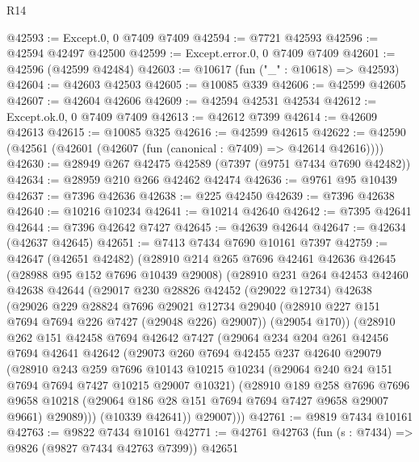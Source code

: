 \begin{lexlean}{R14}
\begin{coremodule}
@42593 := Except.{0, 0} @7409 @7409
@42594 := @7721 @42593
@42596 := @42594 @42497 @42500
@42599 := Except.error.{0, 0} @7409 @7409
@42601 := @42596 (@42599 @42484)
@42603 := @10617 (fun ("_" : @10618) => @42593)
@42604 := @42603 @42503
@42605 := @10085 @339
@42606 := @42599 @42605
@42607 := @42604 @42606
@42609 := @42594 @42531 @42534
@42612 := Except.ok.{0, 0} @7409 @7409
@42613 := @42612 @7399
@42614 := @42609 @42613
@42615 := @10085 @325
@42616 := @42599 @42615
@42622 := @42590 (@42561 (@42601 (@42607 (fun (canonical : @7409) => @42614 @42616))))
@42630 := @28949 @267 @42475 @42589 (@7397 (@9751 @7434 @7690 @42482))
@42634 := @28959 @210 @266 @42462 @42474
@42636 := @9761 @95 @10439
@42637 := @7396 @42636
@42638 := @225 @42450
@42639 := @7396 @42638
@42640 := @10216 @10234
@42641 := @10214 @42640
@42642 := @7395 @42641
@42644 := @7396 @42642 @7427
@42645 := @42639 @42644
@42647 := @42634 (@42637 @42645)
@42651 := @7413 @7434 @7690 @10161 @7397
@42759 := @42647
    (@42651 @42482)
    (@28910
      @214
      @265
      @7696
      @42461
      @42636
      @42645
      (@28988 @95 @152 @7696 @10439 @29008)
      (@28910
        @231
        @264
        @42453
        @42460
        @42638
        @42644
        (@29017
          @230
          @28826
          @42452
          (@29022 @12734)
          @42638
          (@29026
            @229
            @28824
            @7696
            @29021
            @12734
            @29040
            (@28910 @227 @151 @7694 @7694 @226 @7427 (@29048 @226) @29007))
          (@29054 @170))
        (@28910
          @262
          @151
          @42458
          @7694
          @42642
          @7427
          (@29064
            @234
            @204
            @261
            @42456
            @7694
            @42641
            @42642
            (@29073
              @260
              @7694
              @42455
              @237
              @42640
              @29079
              (@28910
                @243
                @259
                @7696
                @10143
                @10215
                @10234
                (@29064 @240 @24 @151 @7694 @7694 @7427 @10215 @29007 @10321)
                (@28910
                  @189
                  @258
                  @7696
                  @7696
                  @9658
                  @10218
                  (@29064 @186 @28 @151 @7694 @7694 @7427 @9658 @29007 @9661)
                  @29089)))
            (@10339 @42641))
          @29007)))
@42761 := @9819 @7434 @10161
@42763 := @9822 @7434 @10161
@42771 := @42761 @42763 (fun (s : @7434) => @9826 (@9827 @7434 @42763 @7399)) @42651

\end{coremodule}
\end{lexlean}

